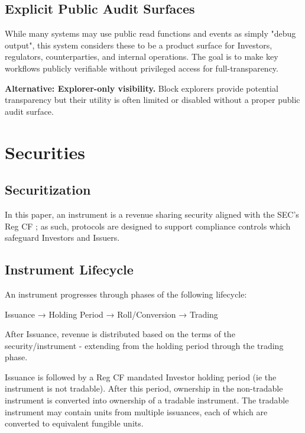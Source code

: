 \documentclass[10pt]{article}
\begin{document}
\subsection{Explicit Public Audit Surfaces}
While many systems may use public read functions and events as simply "debug output", this system considers these to be a product surface for Investors, regulators, counterparties, and internal operations. The goal is to make key workflows publicly verifiable without privileged access for full-transparency.

\textbf{Alternative: Explorer-only visibility.} Block explorers provide potential transparency but their utility is often limited or disabled without a proper public audit surface.

\section{Securities}

\subsection{Securitization}
In this paper, an instrument is a revenue sharing security aligned with the SEC's Reg CF \cite{finra_funding_portals};
as such, protocols are designed to support compliance controls which safeguard Investors and Issuers.

\subsection{Instrument Lifecycle}
An instrument progresses through phases of the following lifecycle:

\begin{center}
    \color{GigaIndigo}Issuance → Holding Period → Roll/Conversion → Trading
\end{center}

After Issuance, revenue is distributed based on the terms of the security/instrument - extending from the holding period through the trading phase.

Issuance is followed by a Reg CF mandated Investor holding period (ie the instrument is not tradable). After this period, ownership in the non-tradable instrument is converted into ownership of a tradable instrument. The tradable instrument may contain units from multiple issuances, each of which are converted to equivalent fungible units.
\end{document}
